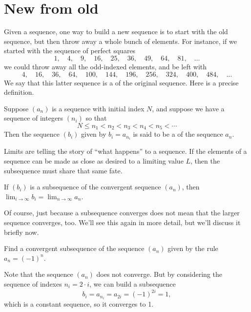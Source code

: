 \documentclass{ximera}
\begin{document}
\section{New from old}

Given a sequence, one way to build a new sequence is to start with the
old sequence, but then throw away a whole bunch of elements.  For
instance, if we started with the sequence of perfect squares
$$
1,\quad 4,\quad 9,\quad 16,\quad 25,\quad 36,\quad 49,\quad 64,\quad 81,\quad\ldots
$$
we could throw away all the odd-indexed elements, and be left with
$$
4,\quad 16,\quad 36,\quad 64,\quad 100,\quad 144,\quad 196,\quad 256,\quad 324,\quad 400,\quad 484,\quad\ldots
$$
We say that this latter sequence is a
of the original sequence.  Here is a precise definition.

\begin{definition}
  Suppose $(a_n)$ is a sequence with initial index $N$, and suppose we have a sequence of integers $(n_i)$ so that
  $$
  N \le n_1 < n_2 < n_3 < n_4 < n_5 < \cdots 
  $$
  Then the sequence $(b_i)$ given by $b_i = a_{n_i}$ is said to be a 
  of the sequence $a_n$.
\end{definition}


Limits are telling the story of ``what happens'' to a sequence.  If
the elements of a sequence can be made as close as desired to a limiting
value $L$, then the subsequence must share that same fate.

\begin{theorem}
  \label{theorem:subsequence-same-limit}
  If $(b_i)$ is a subsequence of the convergent sequence $(a_n)$, then
  $\lim_{i \to \infty} b_i = \lim_{n \to \infty} a_n$.
\end{theorem}

Of course, just because a subsequence converges does not mean that the
larger sequence converges, too.  We'll see this again in more detail,
but we'll discuss it briefly now.

\begin{example}
Find a convergent subsequence of the sequence $(a_n)$ given by the rule $a_n = (-1)^n$.
\end{example}

\begin{explanation}
Note that the sequence $(a_n)$ does not converge.  But by considering the sequence of indexes $n_i = 2 \cdot i$, we can build a subsequence
$$
b_i = a_{n_i} = a_{2i} = (-1)^{2i} = 1,
$$
which is a constant sequence, so it converges to 1.
\end{explanation}
\end{document}

